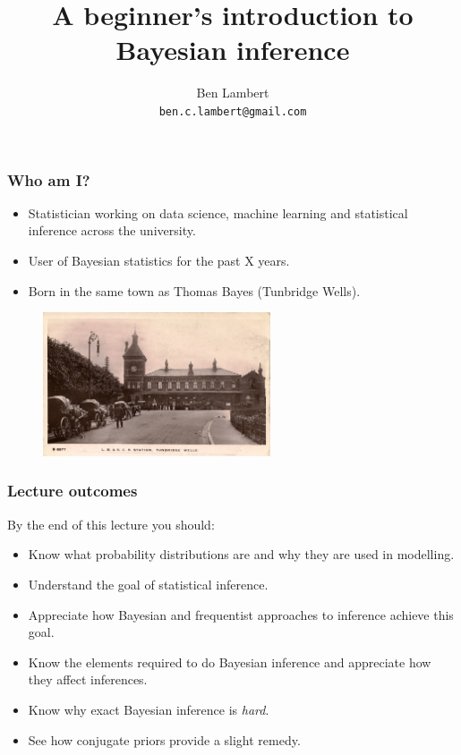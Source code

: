 \documentclass[handout]{beamer}
\title{A beginner's introduction to Bayesian inference}
\author[Ben Lambert]{Ben Lambert\inst{1}\\ \texttt{ben.c.lambert@gmail.com}}
\date{}
\institute[University of Oxford]{
\inst{1}University of Oxford}
\begin{document}
\begin{frame}
\titlepage
\end{frame}

\begin{frame}
	\frametitle{Who am I?}
	\begin{itemize}
		\item Statistician working on data science, machine learning and statistical inference across the university.
		\item User of Bayesian statistics for the past X years.
		\item Born in the same town as Thomas Bayes (Tunbridge Wells).
	\end{itemize}
	
	\begin{figure}[ht]
		\centerline{\includegraphics[width=0.6\textwidth]{./figures/tunbridgeWells.jpg}}
	\end{figure}
	
\end{frame}


\begin{frame}
	\frametitle{Lecture outcomes}
	By the end of this lecture you should:
	
	\begin{itemize}
		\item Know what probability distributions are and why they are used in modelling.
		\item Understand the goal of statistical inference.
		\item Appreciate how Bayesian and frequentist approaches to inference achieve this goal.
		\item Know the elements required to do Bayesian inference and appreciate how they affect inferences.
		\item Know why exact Bayesian inference is \textit{hard}.
		\item See how conjugate priors provide a slight remedy.
	\end{itemize}
	
\end{frame}
\end{document}

